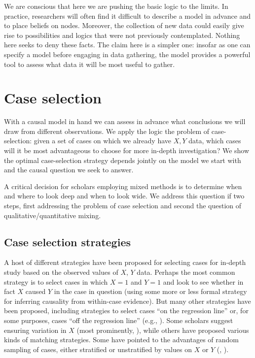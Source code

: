 \documentclass[
  12pt,
]{book}
\newenvironment{headerbox}{
  \definecolor{shadecolor}{rgb}{0.8, 0.8, 0.8}  %
  \color{black}
  \begin{shaded}}{\end{shaded}}
\begin{document}
We are conscious that here we are pushing the basic logic to the limits. In practice, researchers will often find it difficult to describe a model in advance and to place beliefs on nodes. Moreover, the collection of new data could easily give rise to possibilities and logics that were not previously contemplated. Nothing here seeks to deny these facts. The claim here is a simpler one: insofar as one can specify a model before engaging in data gathering, the model provides a powerful tool to assess what data it will be most useful to gather.

\hypertarget{caseselection}{%
\chapter{Case selection}\label{caseselection}}

\begin{headerbox}
With a causal model in hand we can assess in advance what conclusions we will draw from different observations. We apply the logic the problem of case-selection: given a set of cases on which we already have \(X,Y\) data, which cases will it be most advantageous to choose for more in-depth investigation? We show the optimal case-selection strategy depends jointly on the model we start with and the causal question we seek to answer.

\end{headerbox}

A critical decision for scholars employing mixed methods is to determine when and where to look deep and when to look wide. We address this question if two steps, first addressing the problem of case selection and second the question of qualitative/quantitative mixing.

\hypertarget{case-selection-strategies}{%
\section{Case selection strategies}\label{case-selection-strategies}}

A host of different strategies have been proposed for selecting cases for in-depth study based on the observed values of \(X\), \(Y\) data. Perhaps the most common strategy is to select cases in which \(X=1\) and \(Y=1\) and look to see whether in fact \(X\) caused \(Y\) in the case in question (using some more or less formal strategy for inferring causality from within-case evidence). But many other strategies have been proposed, including strategies to select cases ``on the regression line'' or, for some purposes, cases ``off the regression line'' (e.g., \citet{Lieberman2005nested}). Some scholars suggest ensuring variation in \(X\) (most prominently, \citet{king1994designing}), while others have proposed various kinds of matching strategies. Some have pointed to the advantages of random sampling of cases, either stratified or unstratified by values on \(X\) or \(Y\) (\citet{FL2008}, \citet{HerronQuinn}).
\end{document}
